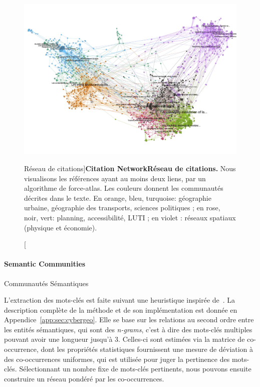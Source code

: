 \begin{figure}[!ht]
\includegraphics[width=\linewidth]{Figures/QuantEpistemo/rawcore}
\caption[Citation Network][Réseau de citations]{\textbf{Citation Network}}{\textbf{Réseau de citations.} Nous visualisons les références ayant au moins deux liens, par un algorithme de force-atlas. Les couleurs donnent les communautés décrites dans le texte. En orange, bleu, turquoise: géographie urbaine, géographie des transports, sciences politiques ; en rose, noir, vert: planning, accessibilité, LUTI ; en violet : réseaux spatiaux (physique et économie).}
\label{fig:quantepistemo:citnw}
\end{figure}





\paragraph{Semantic Communities}{Communautés Sémantiques}


L'extraction des mots-clés est faite suivant une heuristique inspirée de~\cite{chavalarias2013phylomemetic}. La description complète de la méthode et de son implémentation est donnée en Appendice~\ref{app:sec:cybergeo}. Elle se base sur les relations au second ordre entre les entités sémantiques, qui sont des \emph{n-grams}, c'est à dire des mots-clés multiples pouvant avoir une longueur jusqu'à 3. Celles-ci sont estimées via la matrice de co-occurrence, dont les propriétés statistiques fournissent une mesure de déviation à des co-occurrences uniformes, qui est utilisée pour juger la pertinence des mots-clés. Sélectionnant un nombre fixe de mots-clés pertinents, nous pouvons ensuite construire un réseau pondéré par les co-occurrences.


